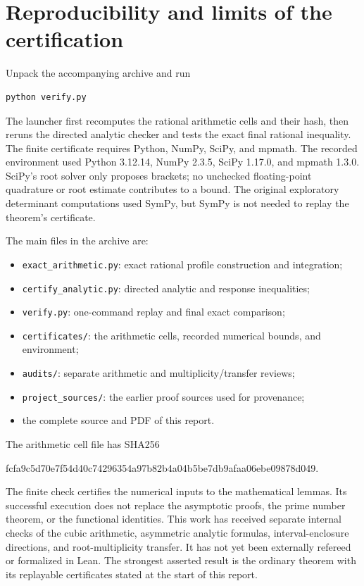 \documentclass[11pt]{article}
\theoremstyle{definition}\newtheorem{definition}[theorem]{Definition}
\theoremstyle{remark}\newtheorem{remark}[theorem]{Remark}
\begin{document}
\section{Reproducibility and limits of the certification}\label{sec:repro}
Unpack the accompanying archive and run
\begin{verbatim}
python verify.py
\end{verbatim}
The launcher first recomputes the rational arithmetic cells and their hash, then reruns the directed analytic checker and tests the exact final rational inequality. The finite certificate requires Python, NumPy, SciPy, and mpmath. The recorded environment used Python 3.12.14, NumPy 2.3.5, SciPy 1.17.0, and mpmath 1.3.0. SciPy's root solver only proposes brackets; no unchecked floating-point quadrature or root estimate contributes to a bound. The original exploratory determinant computations used SymPy, but SymPy is not needed to replay the theorem's certificate.

The main files in the archive are:
\begin{itemize}
\item \texttt{exact\_arithmetic.py}: exact rational profile construction and integration;
\item \texttt{certify\_analytic.py}: directed analytic and response inequalities;
\item \texttt{verify.py}: one-command replay and final exact comparison;
\item \texttt{certificates/}: the arithmetic cells, recorded numerical bounds, and environment;
\item \texttt{audits/}: separate arithmetic and multiplicity/transfer reviews;
\item \texttt{project\_sources/}: the earlier proof sources used for provenance;
\item the complete source and PDF of this report.
\end{itemize}
The arithmetic cell file has SHA256
\begin{center}\small\ttfamily
fcfa9c5d70e7f54d40c74296354a97b82b4a04b5be7db9afaa06ebe09878d049.
\end{center}
The finite check certifies the numerical inputs to the mathematical lemmas. Its successful execution does not replace the asymptotic proofs, the prime number theorem, or the functional identities. This work has received separate internal checks of the cubic arithmetic, asymmetric analytic formulas, interval-enclosure directions, and root-multiplicity transfer. It has not yet been externally refereed or formalized in Lean. The strongest asserted result is the ordinary theorem with its replayable certificates stated at the start of this report.
\end{document}
